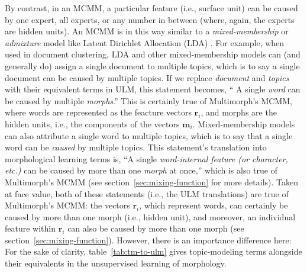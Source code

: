 By contrast, in an \ac{MCMM}, a particular feature (i.e., surface unit) can be caused 
by one expert, all experts, or any number in between (where, again, the experts are hidden units).
An \ac{MCMM} is in this way similar to a \emph{mixed-membership} or \emph{admixture} model like 
Latent Dirichlet Allocation (LDA) \citep{blei-et-al:2003}. For example, 
when used in document clustering, LDA and other mixed-membership models
can (and generally do) assign a single document to multiple topics, which is to say a single document can be caused by multiple topics. If we replace \emph{document} and \emph{topics} with their equivalent terms in ULM, this statement becomes, `` 
A single \emph{word} can be caused by multiple \emph{morphs}.'' This is certainly true of Multimorph's MCMM, where words are represented as the feacture vectors $\textbf{r}_i$, and morphs are the hidden units, i.e., the components of the vectors $\textbf{m}_i$.
Mixed-membership models can also attribute a single word to multiple topics, which is to say that a single word can be \emph{caused} by multiple topics. This statement's translation into morphological learning terms is,
``A single \emph{word-internal feature (or character, etc.)} can be caused by more than one \emph{morph} at once,'' which is also true of Multimorph's MCMM (see section~\ref{sec:mixing-function} for more details).
Taken at face value, both of these statements (i.e., the ULM translations) are true of Multimorph's MCMM: the 
vectors $\textbf{r}_i$, which represent words, can certainly be caused by more than one morph (i.e., hidden unit), and moreover, an individual feature within $\textbf{r}_i$ can also be caused by more than one morph (see section~\ref{sec:mixing-function}). However, there is an importance difference here: 
 For the sake of clarity, table~\ref{tab:tm-to-ulm} gives topic-modeling terms alongside their equivalents in the unsupervised learning of morphology.
